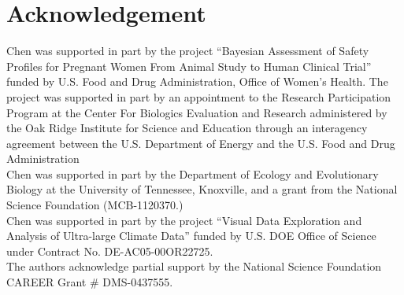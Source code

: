
\section*{Acknowledgement}

Chen was supported in part by the project
``Bayesian Assessment of Safety Profiles for Pregnant Women From Animal
Study to Human Clinical Trial'' funded by U.S. Food and Drug Administration,
Office of Women's Health. The project was supported
in part by an appointment to the Research Participation Program at the
Center For Biologics Evaluation and Research administered by the Oak Ridge
Institute for Science and Education through an interagency agreement between
the U.S. Department of Energy and the U.S. Food and Drug Administration
\\
Chen was supported in part by
the Department of Ecology and Evolutionary Biology at the
University of Tennessee, Knoxville, and a grant from
the National Science Foundation (MCB-1120370.)
\\
Chen was supported in part by the project
``Visual Data Exploration and Analysis of Ultra-large Climate Data''
funded by U.S. DOE Office of Science
under Contract No. DE-AC05-00OR22725.
\\
The authors acknowledge partial support by the National Science Foundation
CAREER Grant \# DMS-0437555.
